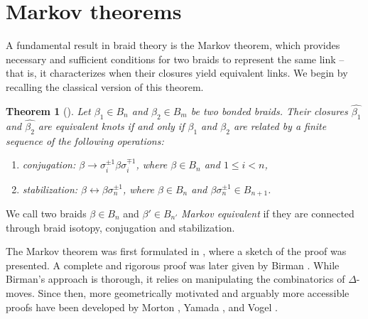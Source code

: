 \documentclass{article}
\theoremstyle{definition}
\theoremstyle{plain}
\newtheorem{theorem}{Theorem}[section]
\theoremstyle{remark}
\begin{document}




\section{Markov theorems}

A fundamental result in braid theory is the Markov theorem, which provides necessary and sufficient conditions for two braids to represent the same link -- that is, it characterizes when their closures yield equivalent links. We begin by recalling the classical version of this theorem.

\begin{theorem}[\cite{markoff1936uuber, birman1974braids}]
    Let $\beta_1 \in B_n$ and $\beta_2 \in B_m$ be two bonded braids.
    Their closures $\hat{\beta_1}$ and $\hat{\beta_2}$  are equivalent knots if and only if  $\beta_1$ and $\beta_2$ are related by a finite sequence of the following operations:
    \begin{enumerate}
        \item conjugation: $\beta \rightarrow \sigma_i^{\pm 1} \beta \sigma_i^{\mp 1}$, where $\beta \in B_n$ and $1 \leq i < n$,
        \item stabilization: $\beta \leftrightarrow \beta \sigma_n^{\pm 1}$, where $\beta \in B_n$ and $\beta \sigma_n^{\pm 1} \in B_{n+1}$. 
    \end{enumerate}
\end{theorem}

We call two braids $\beta \in B_n$ and $\beta' \in B_{n'}$ \emph{Markov equivalent} if they are connected through braid isotopy, conjugation and stabilization.

The Markov theorem was first formulated in \cite{markoff1936uuber}, where a sketch of the proof was presented. A complete and rigorous proof was later given by Birman \cite{birman1974braids}. While Birman’s approach is thorough, it relies on manipulating the combinatorics of $\Delta$-moves. Since then, more geometrically motivated and arguably more accessible proofs have been developed by Morton \cite{morton1986threading}, Yamada \cite{yamada1987minimal}, and Vogel \cite{vogel1990representation}.
\end{document}
